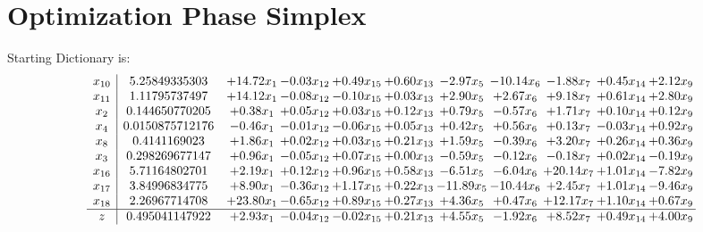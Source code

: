 \documentclass[9pt]{article}
\begin{document}
\section{Optimization Phase Simplex}
Starting Dictionary is:
\[\begin{array}{c| c c@{\hskip 2pt} c@{\hskip 2pt} c@{\hskip 2pt} c@{\hskip 2pt} c@{\hskip 2pt} c@{\hskip 2pt} c@{\hskip 2pt} c@{\hskip 2pt} c@{\hskip 2pt} }
 x_{10}   &  5.25849335303 & + 14.72 x_{1} & -0.03 x_{12} & +  0.49 x_{15} & +  0.60 x_{13} & -2.97 x_{5} & -10.14 x_{6} & -1.88 x_{7} & +  0.45 x_{14} & +  2.12 x_{9}\\
 x_{11}   &  1.11795737497 & + 14.12 x_{1} & -0.08 x_{12} & -0.10 x_{15} & +  0.03 x_{13} & +  2.90 x_{5} & +  2.67 x_{6} & +  9.18 x_{7} & +  0.61 x_{14} & +  2.80 x_{9}\\
 x_{2}   &  0.144650770205 & +  0.38 x_{1} & +  0.05 x_{12} & +  0.03 x_{15} & +  0.12 x_{13} & +  0.79 x_{5} & -0.57 x_{6} & +  1.71 x_{7} & +  0.10 x_{14} & +  0.12 x_{9}\\
 x_{4}   &  0.0150875712176 & -0.46 x_{1} & -0.01 x_{12} & -0.06 x_{15} & +  0.05 x_{13} & +  0.42 x_{5} & +  0.56 x_{6} & +  0.13 x_{7} & -0.03 x_{14} & +  0.92 x_{9}\\
 x_{8}   &  0.4141169023 & +  1.86 x_{1} & +  0.02 x_{12} & +  0.03 x_{15} & +  0.21 x_{13} & +  1.59 x_{5} & -0.39 x_{6} & +  3.20 x_{7} & +  0.26 x_{14} & +  0.36 x_{9}\\
 x_{3}   &  0.298269677147 & +  0.96 x_{1} & -0.05 x_{12} & +  0.07 x_{15} & +  0.00 x_{13} & -0.59 x_{5} & -0.12 x_{6} & -0.18 x_{7} & +  0.02 x_{14} & -0.19 x_{9}\\
 x_{16}   &  5.71164802701 & +  2.19 x_{1} & +  0.12 x_{12} & +  0.96 x_{15} & +  0.58 x_{13} & -6.51 x_{5} & -6.04 x_{6} & + 20.14 x_{7} & +  1.01 x_{14} & -7.82 x_{9}\\
 x_{17}   &  3.84996834775 & +  8.90 x_{1} & -0.36 x_{12} & +  1.17 x_{15} & +  0.22 x_{13} & -11.89 x_{5} & -10.44 x_{6} & +  2.45 x_{7} & +  1.01 x_{14} & -9.46 x_{9}\\
 x_{18}   &  2.26967714708 & + 23.80 x_{1} & -0.65 x_{12} & +  0.89 x_{15} & +  0.27 x_{13} & +  4.36 x_{5} & +  0.47 x_{6} & + 12.17 x_{7} & +  1.10 x_{14} & +  0.67 x_{9}\\
\hline
z    &  0.495041147922 & +  2.93 x_{1} & -0.04 x_{12} & -0.02 x_{15} & +  0.21 x_{13} & +  4.55 x_{5} & -1.92 x_{6} & +  8.52 x_{7} & +  0.49 x_{14} & +  4.00 x_{9}\\
\end{array}\]
\end{document}
